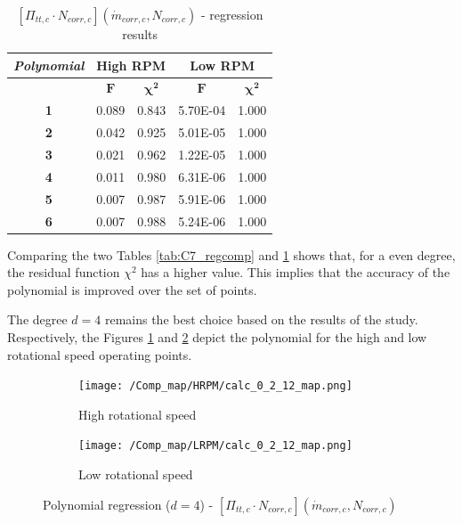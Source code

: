 \begin{longtable}[c]{@{}ccc|cc@{}}
\caption{$[\Pi_{tt,c}\cdot N_{corr,c}](\dot{m}_{corr,c},N_{corr,c})$ - regression results }
\label{tab:C7_regcomp2}\\
\toprule
\textit{\textbf{Polynomial}} & \multicolumn{2}{c|}{High RPM}  & \multicolumn{2}{c}{Low RPM}    \\* \midrule
\endfirsthead
%
\endhead
%
\bottomrule
\endfoot
%
\endlastfoot
%
\multicolumn{1}{c}{\textbf{Degree}}              & \multicolumn{1}{c}{$\mathbf{F}$} & \multicolumn{1}{c|}{$\mathbf{\chi^2}$} & \multicolumn{1}{c}{$\mathbf{F}$} & \multicolumn{1}{c}{$\mathbf{\chi^2}$} \\
\multicolumn{1}{c}{\textbf{1}}                   & 0.089      & 0.843             & 5.70E-04   & 1.000             \\
\multicolumn{1}{c}{\textbf{2}}                   & 0.042      & 0.925             & 5.01E-05   & 1.000             \\
\multicolumn{1}{c}{\textbf{3}}                   & 0.021      & 0.962             & 1.22E-05   & 1.000             \\
\multicolumn{1}{c}{\textbf{4}}                   & 0.011      & 0.980             & 6.31E-06   & 1.000             \\
\multicolumn{1}{c}{\textbf{5}}                   & 0.007      & 0.987             & 5.91E-06   & 1.000             \\
\multicolumn{1}{c}{\textbf{6}}                   & 0.007      & 0.988             & 5.24E-06   & 1.000             \\* \bottomrule
\end{longtable}

Comparing the two Tables \ref{tab:C7_regcomp} and \ref{tab:C7_regcomp2} shows that, for a even degree, the residual function $\chi^2$ has a higher value. This implies that the accuracy of the polynomial is improved over the set of points. 

The degree $d=4$ remains the best choice based on the results of the study. Respectively, the Figures \ref{fig:C7_polycomp_PN_HRPM} and \ref{fig:C7_polycomp_PN_LRPM} depict the polynomial for the high and low rotational speed operating points.

\begin{figure}[H]
    \centering
    \begin{subfigure}[b]{0.4\textwidth}
        \centering
        \texttt{[image: /Comp\_map/HRPM/calc\_0\_2\_12\_map.png]}
        \caption{High rotational speed}
        \label{fig:C7_polycomp_PN_HRPM}
    \end{subfigure}
    \begin{subfigure}[b]{0.4\textwidth}
        \centering
        \texttt{[image: /Comp\_map/LRPM/calc\_0\_2\_12\_map.png]}
        \caption{Low rotational speed}
        \label{fig:C7_polycomp_PN_LRPM}
    \end{subfigure}
    \caption{Polynomial regression ($d=4$) - $[\Pi_{tt,c}\cdot N_{corr,c}](\dot{m}_{corr,c},N_{corr,c})$} \label{fig:C7_polycomp_PN}
\end{figure}

